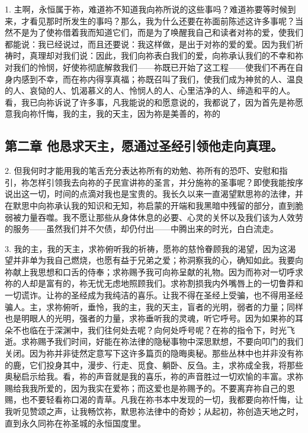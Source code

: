 1. 主啊，永恒属于祢，难道祢不知道我向祢所说的这些事吗？难道祢要等时候到来，才看见那时所发生的事吗？那么，我为什么还要在祢面前陈述这许多事呢？当然不是为了使祢借着我而知道它们，而是为了唤醒我自己和读者对祢的爱，使我们都能说：我已经说过，而且还要说：我这样做，是出于对祢的爱的爱。因为我们祈祷时，真理却对我们说：因此，我们向祢表白我们的爱，向祢承认我们的不幸和祢对我们的怜悯，好使祢彻底解救我们——祢既已开始了这工程——使我们不再在自身内感到不幸，而在祢内得享真福；祢既召叫了我们，使我们成为神贫的人、温良的人、哀恸的人、饥渴慕义的人、怜悯人的人、心里洁净的人、缔造和平的人。看，我已向祢诉说了许多事，凡我能说的和愿意说的，我都说了，因为首先是祢愿意我向祢忏悔，我的主，我的天主，因为祢是美善的，祢的\par


\subsection{第二章 他恳求天主，愿通过圣经引领他走向真理。}

2. 但我何时才能用我的笔舌充分表达祢所有的劝勉、祢所有的恐吓、安慰和指引，祢怎样引领我去向祢的子民宣讲祢的圣言，并分施祢的圣事呢？即使我能按序说出这一切，时间的点滴对我也是宝贵的。我长久以来一直渴望默思祢的法律，并在默思中向祢承认我的知识和无知，祢启蒙的开端和我黑暗中残留的部分，直到脆弱被力量吞噬。我不愿让那些从身体休息的必要、心灵的关怀以及我们该为人效劳的服务——虽然我们并不欠债，却仍付出——中腾出来的时光，白白流走。\par

3. 我的主，我的天主，求祢俯听我的祈祷，愿祢的慈怜眷顾我的渴望，因为这渴望并非单为我自己燃烧，也愿有益于兄弟之爱；祢洞察我的心，确知如此。我要向祢献上我思想和口舌的侍奉；求祢赐予我可向祢呈献的礼物。因为而祢对一切呼求祢的人却是富有的，祢无忧无虑地照顾我们。求祢割损我内外嘴唇上的一切鲁莽和一切谎诈。让祢的圣经成为我纯洁的喜乐。让我不得在圣经上受骗，也不得用圣经骗人。主，求祢俯听，垂怜，我的主，我的天主，盲者的光明，弱者的力量；同样也是明眼人的光明，强者的力量，求祢垂听我的灵魂，听它呼号。因为如果祢的耳朵不也临在于深渊中，我们往何处去呢？向何处呼号呢？在祢的指令下，时光飞逝。求祢赐予我们时间，好能在祢法律的隐秘事物中深思默想，不要向叩门的我们关闭。因为祢并非徒然定意写下这许多篇页的隐晦奥秘。那些丛林中也并非没有祢的鹿，它们投身其中，漫步、行走、觅食、躺卧、反刍。主，求祢成全我，将那些奥秘启示给我。看，祢的声音就是我的喜乐，祢的声音胜过一切欢愉的丰富。求祢赐给我我所爱的，因为我实在爱祢；而这爱也是祢赐予的。不要离弃祢自己的恩赐，也不要轻看祢口渴的青草。凡我在祢书本中发现的一切，我都要向祢忏悔，让我听见赞颂之声，让我畅饮祢，默思祢法律中的奇妙；从起初，祢创造天地之时，直到永久同祢在祢圣城的永恒国度里。\par

